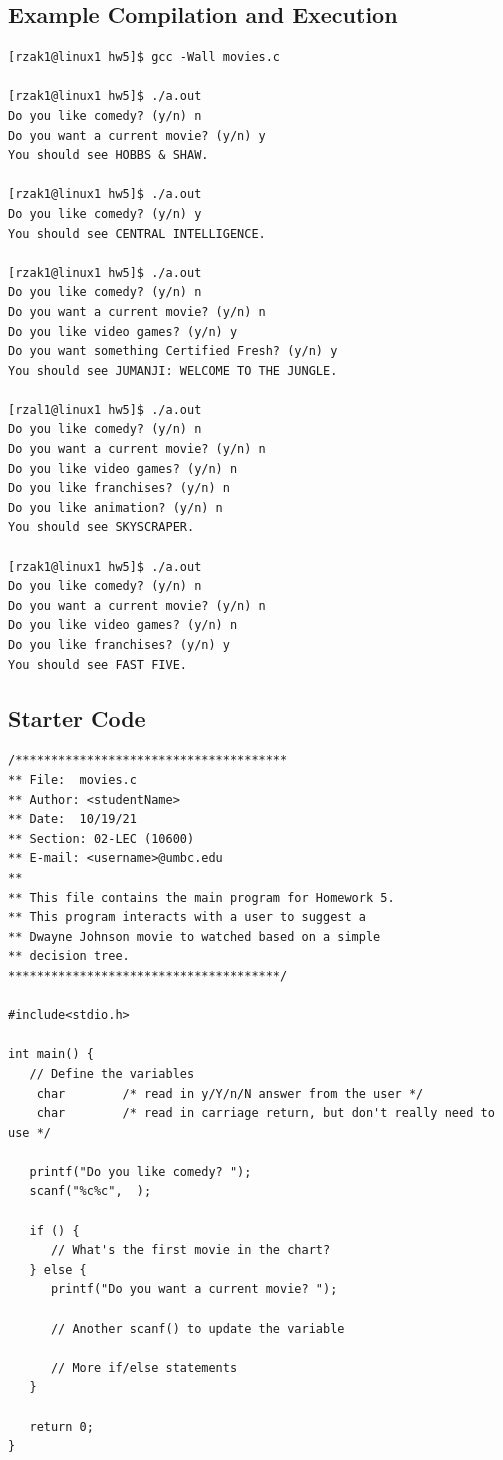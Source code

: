\documentclass[letter,11pt]{article}
\begin{document}
\subsection*{Example Compilation and Execution}
\begin{verbatim}
[rzak1@linux1 hw5]$ gcc -Wall movies.c

[rzak1@linux1 hw5]$ ./a.out
Do you like comedy? (y/n) n
Do you want a current movie? (y/n) y
You should see HOBBS & SHAW.

[rzak1@linux1 hw5]$ ./a.out
Do you like comedy? (y/n) y
You should see CENTRAL INTELLIGENCE.

[rzak1@linux1 hw5]$ ./a.out
Do you like comedy? (y/n) n
Do you want a current movie? (y/n) n
Do you like video games? (y/n) y
Do you want something Certified Fresh? (y/n) y
You should see JUMANJI: WELCOME TO THE JUNGLE.

[rzal1@linux1 hw5]$ ./a.out
Do you like comedy? (y/n) n
Do you want a current movie? (y/n) n
Do you like video games? (y/n) n
Do you like franchises? (y/n) n
Do you like animation? (y/n) n
You should see SKYSCRAPER.

[rzak1@linux1 hw5]$ ./a.out
Do you like comedy? (y/n) n
Do you want a current movie? (y/n) n
Do you like video games? (y/n) n
Do you like franchises? (y/n) y
You should see FAST FIVE.
\end{verbatim}

\subsection*{Starter Code}
\begin{verbatim}
/**************************************
** File:  movies.c
** Author: <studentName>
** Date:  10/19/21
** Section: 02-LEC (10600)
** E-mail: <username>@umbc.edu
**
** This file contains the main program for Homework 5.
** This program interacts with a user to suggest a
** Dwayne Johnson movie to watched based on a simple
** decision tree.
**************************************/

#include<stdio.h>

int main() {
   // Define the variables
    char        /* read in y/Y/n/N answer from the user */
    char        /* read in carriage return, but don't really need to use */

   printf("Do you like comedy? ");
   scanf("%c%c",  );

   if () {
      // What's the first movie in the chart?
   } else {
      printf("Do you want a current movie? ");
      
      // Another scanf() to update the variable

      // More if/else statements
   }

   return 0;
}
\end{verbatim}
\end{document}
